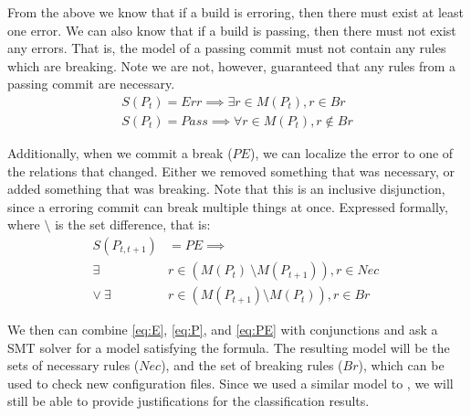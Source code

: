 From the above we know that if a build is erroring, then there must exist at least one error.
We can also know that if a build is passing, then there must not exist any errors.
That is, the model of a passing commit must not contain any rules which are breaking.
Note we are not, however, guaranteed that any rules from a passing commit are necessary.
\begin{align}
  S(P_t) = Err \implies \exists r \in  M (P_t), r \in Br \label{eq:E}\\
  S(P_t) = Pass \implies \forall r \in  M (P_t), r \notin Br \label{eq:P}
\end{align}

Additionally, when we commit a break ($PE$), we can localize the error to one of the relations that changed.
Either we removed something that was necessary, or added something that was breaking.
Note that this is an inclusive disjunction, since a erroring commit can break multiple things at once.
Expressed formally, where $\setminus$ is the set difference, that is:
\begin{align}
  S(P_{t,t+1}) &= PE \implies \nonumber \\
  \exists& r \in (M(P_{t})\ \setminus M(P_{t+1})), r \in Nec\ \nonumber \\
  \lor \ \exists& r \in (M(P_{t+1}) \setminus M(P_{t})), r \in Br \label{eq:PE}
\end{align}

We then can combine \eqref{eq:E}, \eqref{eq:P}, and  \eqref{eq:PE} with
conjunctions and ask a SMT solver for a model satisfying the formula.
The resulting model will be the sets of necessary rules ($Nec$), and the set of breaking rules ($Br$), which can be used to check new configuration files.
Since we used a similar model to \app, we will still be able to provide justifications for the classification results.


